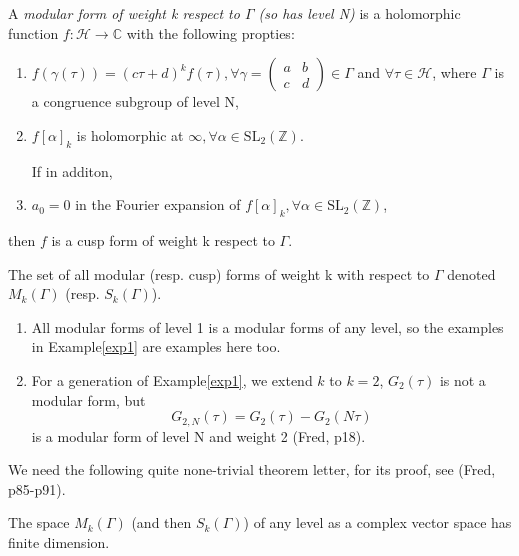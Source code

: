     \begin{definition}
        A \textit{modular form of weight k respect to $\Gamma$ (so has level N)} is a holomorphic function $f: \mathcal{H} \to \mathbb{C}$ with the following propties:
        \begin{enumerate}
            \item $f(\gamma(\tau))=(c\tau +d)^kf(\tau), \forall \gamma = 
                \left(
                    \begin{smallmatrix}
                    a & b \\
                    c & d
                    \end{smallmatrix}
                \right)\in \Gamma$ and $\forall\tau \in \mathcal{H}$, where $\Gamma$ is a congruence subgroup of level N,
            \item $f[\alpha]_k$ is holomorphic at $\infty, \forall \alpha \in \mathrm{SL}_2(\mathbb{Z})$.
            
            If in additon,
            \item $a_0=0$ in the Fourier expansion of  $f[\alpha]_k, \forall \alpha\in \mathrm{SL}_2(\mathbb{Z}) $,
        \end{enumerate}
        then $f$ is a cusp form of weight k respect to $\Gamma$.

        The set of all modular (resp. cusp) forms of weight k with respect to $\Gamma$ denoted $M_k(\Gamma)$ (resp. $S_k(\Gamma)$).  
    \end{definition}

    \begin{example}
        \begin{enumerate}
            \item All modular forms of level 1 is a modular forms of any level, so the examples in Example\ref{exp1} are  examples here too.
            \item For a generation of  Example\ref{exp1}, we extend $k$ to $k=2$, $G_{2}(\tau)$ is not a modular form, but 
            $$ G_{2,N}(\tau)=G_{2}(\tau)-G_{2}(N\tau)$$
            is a modular form of level N and weight 2 (Fred, p18).
        \end{enumerate}
    \end{example}

    We need the following quite none-trivial theorem letter, for its proof, see (Fred, p85-p91).

    \begin{theorem}\label{finite dimension}
        The space $M_k(\Gamma)$ (and then $S_k(\Gamma)$) of any level as a complex vector space has finite dimension.
    \end{theorem}
    
